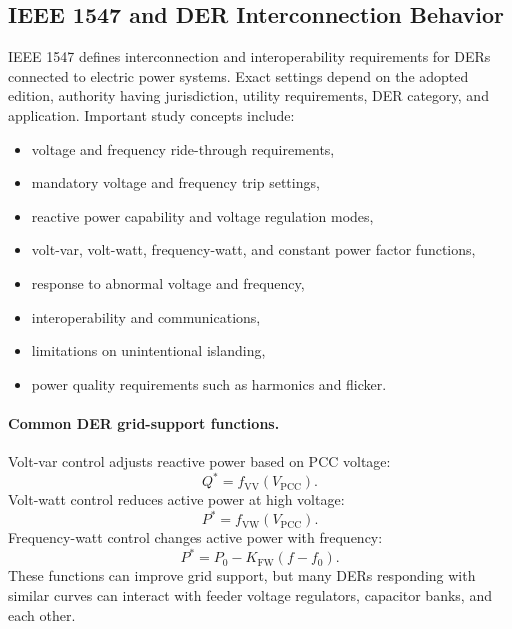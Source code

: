 \documentclass[11pt]{article}
\begin{document}
\subsection{IEEE 1547 and DER Interconnection Behavior}
IEEE 1547 defines interconnection and interoperability requirements for DERs
connected to electric power systems. Exact settings depend on the adopted
edition, authority having jurisdiction, utility requirements, DER category, and
application. Important study concepts include:
\begin{itemize}
  \item voltage and frequency ride-through requirements,
  \item mandatory voltage and frequency trip settings,
  \item reactive power capability and voltage regulation modes,
  \item volt-var, volt-watt, frequency-watt, and constant power factor functions,
  \item response to abnormal voltage and frequency,
  \item interoperability and communications,
  \item limitations on unintentional islanding,
  \item power quality requirements such as harmonics and flicker.
\end{itemize}

\paragraph{Common DER grid-support functions.}
Volt-var control adjusts reactive power based on PCC voltage:
\begin{equation}
Q^*=f_{\mathrm{VV}}(V_{\mathrm{PCC}}).
\end{equation}
Volt-watt control reduces active power at high voltage:
\begin{equation}
P^*=f_{\mathrm{VW}}(V_{\mathrm{PCC}}).
\end{equation}
Frequency-watt control changes active power with frequency:
\begin{equation}
P^*=P_0-K_{\mathrm{FW}}(f-f_0).
\end{equation}
These functions can improve grid support, but many DERs responding with similar
curves can interact with feeder voltage regulators, capacitor banks, and each
other.
\end{document}
